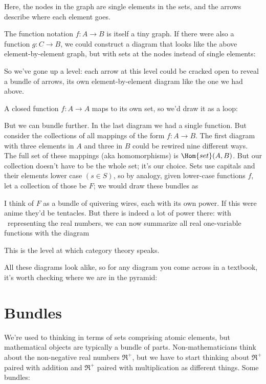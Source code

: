 \documentclass[11pt]{article}
\begin{document}
Here, the nodes in the graph are single elements in the sets, and the arrows describe
where each element goes.

The function notation $f:A\to B$ is itself a tiny graph. If there were also a function
$g:C\to B$, we could construct a diagram that looks like the above element-by-element graph, but with sets at the nodes instead of single elements:

So we've gone up a level: each arrow at this level could be cracked open to reveal
a bundle of arrows, its own element-by-element diagram like the one we had above.

A closed function $f:A\to A$ maps to its own set, so we'd draw it as a loop:


But we can bundle further. In the last diagram we had a single function. But
consider the collections of all
mappings of the form $f:A\to B$. The first diagram with three elements in $A$ and
three in $B$ could be rewired nine different ways. The full set of these mappings (aka
homomorphisms) is $\Hom{set}(A, B)$. But our collection doesn't have to be the whole set;
it's our choice. Sets use capitals and their elements lower case $(s\in S)$, so by
analogy, given lower-case functions $f$, let a collection of those be $F$; we would draw these
bundles as


I think of $F$ as a bundle of quivering wires, each with its own power. If this were anime
they'd be tentacles. But there is indeed a lot of power there: with \Re\ representing the
real numbers, we can now summarize all real one-variable functions with the diagram 

This is the level at which category theory speaks.

All these diagrams look alike, so for any diagram you come across in a textbook, it's
worth checking where we are in the pyramid:

\section{Bundles}\label{bundlesec}
We're used to thinking in terms of sets comprising atomic elements, but mathematical
objects are typically a bundle of parts. Non-mathematicians think about the non-negative real numbers
$\Re^+$, but we have to start thinking about $\Re^+$ paired with addition and $\Re^+$
paired with multiplication as different things. Some bundles:
\end{document}
